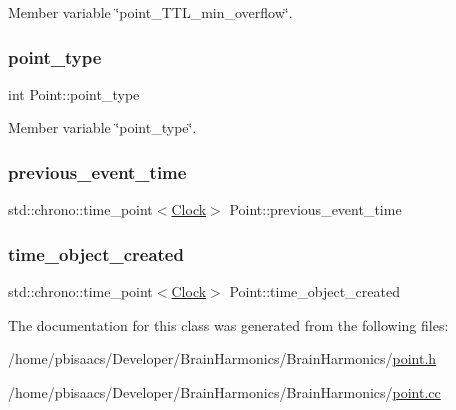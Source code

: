 Member variable \char`\"{}point\+\_\+\+T\+T\+L\+\_\+min\+\_\+overflow\char`\"{}. 

\mbox{\label{classPoint_aa672daab7c7949e840dfe79980d162b5}} 
\subsubsection{\texorpdfstring{point\+\_\+type}{point\_type}}
{\footnotesize\ttfamily int Point\+::point\+\_\+type\hspace{0.3cm}{\ttfamily [private]}}



Member variable \char`\"{}point\+\_\+type\char`\"{}. 

\mbox{\label{classPoint_abdae57027e086386d297d503feba1b41}} 
\subsubsection{\texorpdfstring{previous\+\_\+event\+\_\+time}{previous\_event\_time}}
{\footnotesize\ttfamily std\+::chrono\+::time\+\_\+point$<$\mbox{\hyperlink{universe_8h_a0ef8d951d1ca5ab3cfaf7ab4c7a6fd80}{Clock}}$>$ Point\+::previous\+\_\+event\+\_\+time\hspace{0.3cm}{\ttfamily [private]}}

\mbox{\label{classPoint_a7d06d004516b58e6a6d85a35e689b28a}} 
\subsubsection{\texorpdfstring{time\+\_\+object\+\_\+created}{time\_object\_created}}
{\footnotesize\ttfamily std\+::chrono\+::time\+\_\+point$<$\mbox{\hyperlink{universe_8h_a0ef8d951d1ca5ab3cfaf7ab4c7a6fd80}{Clock}}$>$ Point\+::time\+\_\+object\+\_\+created\hspace{0.3cm}{\ttfamily [private]}}



The documentation for this class was generated from the following files\+:\begin{DoxyCompactItemize}
\item 
/home/pbisaacs/\+Developer/\+Brain\+Harmonics/\+Brain\+Harmonics/\mbox{\hyperlink{point_8h}{point.\+h}}\item 
/home/pbisaacs/\+Developer/\+Brain\+Harmonics/\+Brain\+Harmonics/\mbox{\hyperlink{point_8cc}{point.\+cc}}\end{DoxyCompactItemize}
